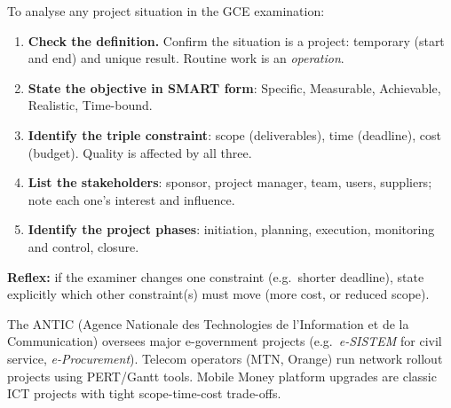 \documentclass[11pt]{article}
\newcommand{\cle}[1]{{\popxbold\color{popdark}#1}}
\begin{document}
\begin{methode}
To analyse any project situation in the GCE examination:
\begin{enumerate}
\item \textbf{Check the definition.} Confirm the situation is a \cle{project}: temporary (start and end) and unique result. Routine work is an \emph{operation}.
\item \textbf{State the objective in SMART form}: Specific, Measurable, Achievable, Realistic, Time-bound.
\item \textbf{Identify the triple constraint}: \cle{scope} (deliverables), \cle{time} (deadline), \cle{cost} (budget). Quality is affected by all three.
\item \textbf{List the stakeholders}: sponsor, project manager, team, users, suppliers; note each one's interest and influence.
\item \textbf{Identify the project phases}: initiation, planning, execution, monitoring and control, closure.
\end{enumerate}
\textbf{Reflex:} if the examiner changes one constraint (e.g.\ shorter deadline), state explicitly which other constraint(s) must move (more cost, or reduced scope).
\end{methode}

\begin{savaistu}
The \cle{ANTIC} (Agence Nationale des Technologies de l'Information et de la Communication) oversees major e-government projects (e.g.\ \emph{e-SISTEM} for civil service, \emph{e-Procurement}). Telecom operators (MTN, Orange) run network rollout projects using PERT/Gantt tools. Mobile Money platform upgrades are classic ICT projects with tight scope-time-cost trade-offs.
\end{savaistu}
\end{document}
